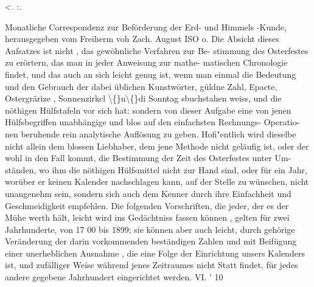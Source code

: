 \documentclass[12pt,a4paper]{article}
\begin{document}
<.  :.

\newpage


\newpage

Monatliche  Correspondenz  zur  Beförderung  der  Erd-  und  Himmels -Kunde,
herausgegeben  vom  Freiherm  voh  Zach.     August  ISO o.
Die  Absicht  dieses  Aufsatzes  ist  nicht ,  das  gewöhnliche  Verfahren  zur  Be-
stimmung des  Osterfestes  zu  erörtern,  das  man  in  jeder  Anweisung  zur  mathe-
matischen Chronologie  findet,  und  das  auch  an  sich  leicht  genug  ist,  wenn  man
einmal  die  Bedeutung  und  den  Gebrauch  der  dabei  üblichen  Kunstwörter,  güldne
Zahl,  Epacte,  Ostergrärize ,  Sonnenzirkcl  \textbackslash\{\}n\textbackslash\{\}di  Sonntag sbuchstahen  weiss,  und  die
nöthigen  Hülfstafeln  vor  sich  hat:  sondern  von  dieser  Aufgabe  eine  von  jenen
Hülfsbegriffen  unabhängige  und  blos  auf  den  einfachsten  Rechnungs- Operatio-
nen beruhende  rein  analytische  Auflösung  zu  geben.  Hofi"entlich  wird  dieselbe
nicht  allein  dem  blossen  Liebhaber,  dem  jene  Methode  nicht  geläufig  ist,  oder
der  wohl  in  den  Fall  kommt,  die  Bestimmung  der  Zeit  des  Osterfestes  unter  Um-
ständen, wo  ihm  die  nöthigen  Hülfsmittel  nicht  zur  Hand  sind,  oder  für  ein  Jahr,
worüber  er  keinen  Kalender  nachschlagen  kann,  auf  der  Stelle  zu  wünschen,
nicht  unangenehm  sein,  sondern  sich  auch  dem  Kenner  durch  ihre  Einfachheit
und  Geschmeidigkeit  empfehlen.  Die  folgenden  Vorschriften,  die  jeder,  der  es
der  Mühe  werth  hält,  leicht  wird  ins  Gedächtniss  fassen  können ,  gelten  für  zwei
Jahrhunderte,  von  17  00  bis  1899;  sie  können  aber  auch  leicht,  durch  gehörige
Veränderung  der  darin  vorkommenden  beständigen  Zahlen  und  mit  Beifügung
einer  unerheblichen  Ausnahme ,  die  eine  Folge  der  Einrichtung  unsers  Kalenders
ist,  und  zufälliger  Weise  während  jenes  Zeitraumes  nicht  Statt  findet,  für  jedes
andere  gegebene  Jahrhundert  eingerichtet  werden.
VI.  '  10

\newpage
\end{document}
